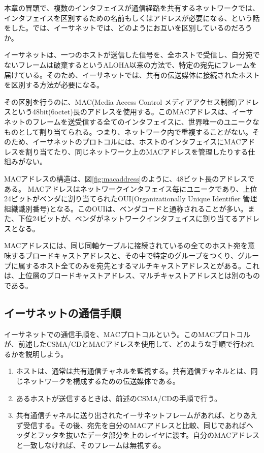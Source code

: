 本章の冒頭で、複数のインタフェイスが通信経路を共有するネットワークでは、インタフェイスを区別するための名前もしくはアドレスが必要になる、という話をした。では、イーサネットでは、どのようにお互いを区別しているのだろうか。

イーサネットは、一つのホストが送信した信号を、全ホストで受信し、自分宛でないフレームは破棄するというALOHA以来の方法で、特定の宛先にフレームを届けている。そのため、イーサネットでは、共有の伝送媒体に接続されたホストを区別する方法が必要になる。

その区別を行うのに、MAC(Media Access Control メディアアクセス制御)アドレスという48bit(6octet)長のアドレスを使用する。このMACアドレスは、イーサネットのフレームを送受信する全てのインタフェイスに、世界唯一のユニークなものとして割り当てられる。つまり、ネットワーク内で重複することがない。そのため、イーサネットのプロトコルには、ホストのインタフェイスにMACアドレスを割り当てたり、同じネットワーク上のMACアドレスを管理したりする仕組みがない。



MACアドレスの構造は、図\ref{fig:macaddress}のように、48ビット長のアドレスである。
MACアドレスはネットワークインタフェイス毎にユニークであり、上位24ビットがベンダに割り当てられたOUI(Organizationally Unique Identifier 管理組織識別番号)となる。このOUIは、ベンダコードと通称されることが多い。また、下位24ビットが、ベンダがネットワークインタフェイスに割り当てるアドレスとなる。

MACアドレスには、同じ同軸ケーブルに接続されているの全てのホスト宛を意味するブロードキャストアドレスと、その中で特定のグループをつくり、グループに属するホスト全てのみを宛先とするマルチキャストアドレスとがある。これは、上位層のブロードキャストアドレス、マルチキャストアドレスとは別のものである。

\subsection{イーサネットの通信手順}

イーサネットでの通信手順を、MACプロトコルという。このMACプロトコルが、前述したCSMA/CDとMACアドレスを使用して、どのような手順で行われるかを説明しよう。
\begin{enumerate}
\item ホストは、通常は共有通信チャネルを監視する。共有通信チャネルとは、同じネットワークを構成するための伝送媒体である。
\item あるホストが送信するときは、前述のCSMA/CDの手順で行う。
\item 共有通信チャネルに送り出されたイーサネットフレームがあれば、とりあえず受信する。その後、宛先を自分のMACアドレスと比較、同じであればヘッダとフッタを抜いたデータ部分を上のレイヤに渡す。自分のMACアドレスと一致しなければ、そのフレームは無視する。
\end{enumerate}

